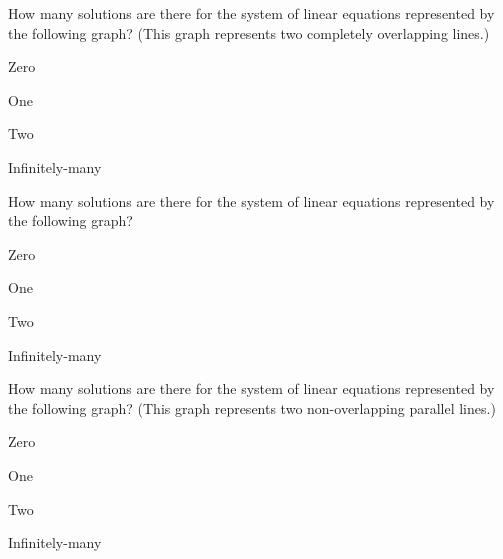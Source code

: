 \documentclass{article}
\begin{document}
\begin{readinessAssuranceTest}
\item How many solutions are there for the system of linear equations
      represented by the following graph? (This graph represents two completely
      overlapping lines.)
    \begin{center}
      \systemWithInfinitelyManySolutions
    \end{center}

\begin{multicols}{4}
\begin{readinessAssuranceTestChoices}
\item Zero
\item One
\item Two
\item Infinitely-many %
\end{readinessAssuranceTestChoices}
\end{multicols}


\item How many solutions are there for the system of linear equations
      represented by the following graph?
    \begin{center}
      \systemWithOneSolutionA
    \end{center}

\begin{multicols}{4}
\begin{readinessAssuranceTestChoices}
\item Zero
\item One %
\item Two
\item Infinitely-many
\end{readinessAssuranceTestChoices}
\end{multicols}


\item How many solutions are there for the system of linear equations
      represented by the following graph? (This graph represents two
      non-overlapping parallel lines.)
    \begin{center}
      \systemWithNoSolutions
    \end{center}

\begin{multicols}{4}
\begin{readinessAssuranceTestChoices}
\item Zero %
\item One
\item Two
\item Infinitely-many
\end{readinessAssuranceTestChoices}
\end{multicols}



\end{readinessAssuranceTest}
\end{document}
